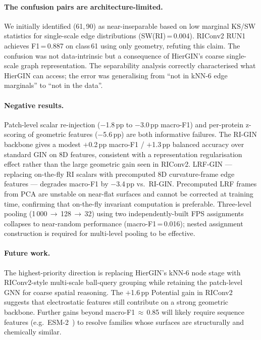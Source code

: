 \paragraph{The confusion pairs are architecture-limited.}
We initially identified (61,\,90) as near-inseparable based on low marginal
KS/SW statistics for single-scale edge distributions (SW(RI)\,=\,0.004).
RIConv2 RUN1 achieves F1\,=\,0.887 on class\,61 using only geometry,
refuting this claim.
The confusion was not data-intrinsic but a consequence of HierGIN's
coarse single-scale graph representation.
The separability analysis correctly characterised what HierGIN can access;
the error was generalising from ``not in kNN-6 edge marginals'' to
``not in the data''.

\paragraph{Negative results.}
Patch-level scalar re-injection ($-$1.8\,pp to $-$3.0\,pp macro-F1) and
per-protein z-scoring of geometric features ($-$5.6\,pp) are both informative
failures.
The RI-GIN backbone gives a modest $+$0.2\,pp macro-F1 / $+$1.3\,pp balanced
accuracy over standard GIN on 8D features, consistent with a representation
regularisation effect rather than the large geometric gain seen in RIConv2.
LRF-GIN --- replacing on-the-fly RI scalars with precomputed 8D curvature-frame
edge features --- degrades macro-F1 by $-$3.4\,pp vs.\ RI-GIN.
Precomputed LRF frames from PCA are unstable on near-flat surfaces and cannot be
corrected at training time, confirming that on-the-fly invariant computation is preferable.
Three-level pooling (1\,000\,$\to$\,128\,$\to$\,32) using two independently-built
FPS assignments collapses to near-random performance (macro-F1\,=\,0.016);
nested assignment construction is required for multi-level pooling to be effective.

\paragraph{Future work.}
The highest-priority direction is replacing HierGIN's kNN-6 node stage with
RIConv2-style multi-scale ball-query grouping while retaining the patch-level
GNN for coarse spatial reasoning.
The $+$1.6\,pp Potential gain in RIConv2 suggests that electrostatic features
still contribute on a strong geometric backbone.
Further gains beyond macro-F1\,$\approx$\,0.85 will likely require sequence
features (e.g.\ ESM-2~\cite{esm2}) to resolve families whose surfaces are
structurally and chemically similar.
